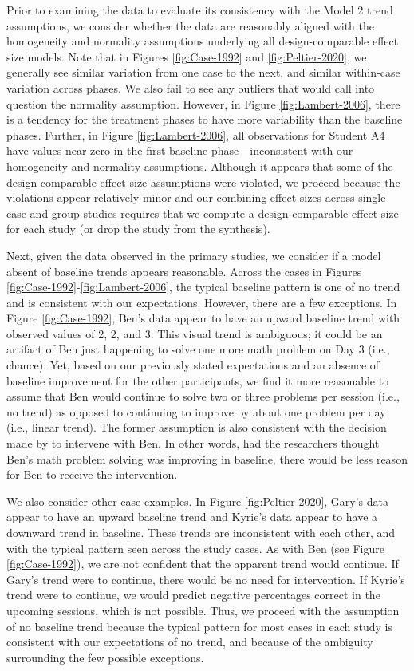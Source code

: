 \documentclass[
]{book}
\begin{document}
Prior to examining the data to evaluate its consistency with the Model 2 trend assumptions, we consider whether the data are reasonably aligned with the homogeneity and normality assumptions underlying all design-comparable effect size models. Note that in Figures \ref{fig:Case-1992} and \ref{fig:Peltier-2020}, we generally see similar variation from one case to the next, and similar within-case variation across phases. We also fail to see any outliers that would call into question the normality assumption. However, in Figure \ref{fig:Lambert-2006}, there is a tendency for the treatment phases to have more variability than the baseline phases. Further, in Figure \ref{fig:Lambert-2006}, all observations for Student A4 have values near zero in the first baseline phase---inconsistent with our homogeneity and normality assumptions. Although it appears that some of the design-comparable effect size assumptions were violated, we proceed because the violations appear relatively minor and our combining effect sizes across single-case and group studies requires that we compute a design-comparable effect size for each study (or drop the study from the synthesis).

Next, given the data observed in the primary studies, we consider if a model absent of baseline trends appears reasonable. Across the cases in Figures \ref{fig:Case-1992}-\ref{fig:Lambert-2006}, the typical baseline pattern is one of no trend and is consistent with our expectations. However, there are a few exceptions. In Figure \ref{fig:Case-1992}, Ben's data appear to have an upward baseline trend with observed values of 2, 2, and 3. This visual trend is ambiguous; it could be an artifact of Ben just happening to solve one more math problem on Day 3 (i.e., chance). Yet, based on our previously stated expectations and an absence of baseline improvement for the other participants, we find it more reasonable to assume that Ben would continue to solve two or three problems per session (i.e., no trend) as opposed to continuing to improve by about one problem per day (i.e., linear trend). The former assumption is also consistent with the decision made by \citet{case1992Improving} to intervene with Ben. In other words, had the researchers thought Ben's math problem solving was improving in baseline, there would be less reason for Ben to receive the intervention.

We also consider other case examples. In Figure \ref{fig:Peltier-2020}, Gary's data appear to have an upward baseline trend and Kyrie's data appear to have a downward trend in baseline. These trends are inconsistent with each other, and with the typical pattern seen across the \citet{peltier2020Effects} study cases. As with Ben (see Figure \ref{fig:Case-1992}), we are not confident that the apparent trend would continue. If Gary's trend were to continue, there would be no need for intervention. If Kyrie's trend were to continue, we would predict negative percentages correct in the upcoming sessions, which is not possible. Thus, we proceed with the assumption of no baseline trend because the typical pattern for most cases in each study is consistent with our expectations of no trend, and because of the ambiguity surrounding the few possible exceptions.
\end{document}
